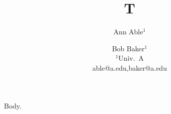 \documentclass{article}
\title{T}
\author{Ann Able$^{1}$ \and Bob Baker$^{1}$\\ $^{1}$Univ.\ A\\ able@a.edu\sep baker@a.edu}
\begin{document}
\maketitle
Body.
\end{document}
